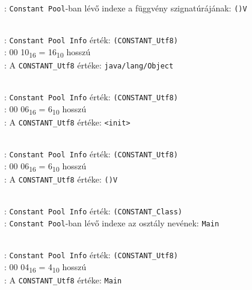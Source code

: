 \begin{compactitem}
\begin{compactitem}
    : \lstinline{Constant Pool}-ban lévő indexe a függvény szignatúrájának: \lstinline{()V}
	\item {}   \\
	: \lstinline{Constant Pool Info} érték: \lstinline{(CONSTANT_Utf8)} \\
    : 00 10\textsubscript{16} = 16\textsubscript{10} hosszú \\
    : A \lstinline{CONSTANT_Utf8} értéke: \lstinline{java/lang/Object}
	\item {}   \\
	: \lstinline{Constant Pool Info} érték: \lstinline{(CONSTANT_Utf8)} \\
    : 00 06\textsubscript{16} = 6\textsubscript{10} hosszú \\
    : A \lstinline{CONSTANT_Utf8} értéke: \lstinline{<init>}
	\item {}   \\
	: \lstinline{Constant Pool Info} érték: \lstinline{(CONSTANT_Utf8)} \\
    : 00 06\textsubscript{16} = 6\textsubscript{10} hosszú \\
    : A \lstinline{CONSTANT_Utf8} értéke: \lstinline{()V}
	\item {}  \\
	: \lstinline{Constant Pool Info} érték: \lstinline{(CONSTANT_Class)} \\
    : \lstinline{Constant Pool}-ban lévő indexe az osztály nevének: \lstinline{Main}
	\item {}   \\
	: \lstinline{Constant Pool Info} érték: \lstinline{(CONSTANT_Utf8)} \\
    : 00 04\textsubscript{16} = 4\textsubscript{10} hosszú \\
    : A \lstinline{CONSTANT_Utf8} értéke: \lstinline{Main}
	\item {}   \\

\end{compactitem}
\end{compactitem}
